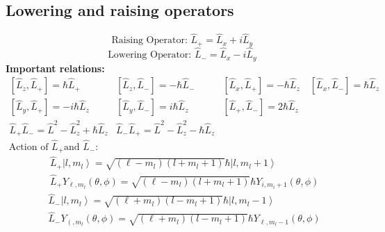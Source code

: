 \subsection{Lowering and raising operators}
	$$\text { Raising Operator: }  \hat{L}_{+}=\hat{L}_{x}+i \hat{L}_{y}$$
	$$\text { Lowering Operator: }  \hat{L}_{-}=\hat{L}_{x}-i \hat{L}_{y}$$
\textbf{Important relations:}
$$
\begin{array}{lll}
{\left[\hat{L}_{z}, \hat{L}_{+}\right]=\hbar \hat{L}_{+}} & {\left[\hat{L}_{z}, \hat{L}_{-}\right]=-\hbar \hat{L}_{-}} & {\left[\hat{L}_{x}, \hat{L}_{+}\right]=-\hbar \hat{L}_{z} \quad\left[\hat{L}_{x}, \hat{L}_{-}\right]=\hbar \hat{L}_{z}} \\
{\left[\hat{L}_{y}, \hat{L}_{+}\right]=-i \hbar \hat{L}_{z}} & {\left[\hat{L}_{y}, \hat{L}_{-}\right]=i \hbar \hat{L}_{z}} & {\left[\hat{L}_{+}, \hat{L}_{-}\right]=2 \hbar \hat{L}_{z}} \\
\hat{L}_{+} \hat{L}_{-}=\hat{L}^{2}-\hat{L}_{z}^{2}+\hbar \hat{L}_{z} & \hat{L}_{-} \hat{L}_{+}=\hat{L}^{2}-\hat{L}_{z}^{2}-\hbar \hat{L}_{z}
\end{array}
$$
$\text { Action of } \hat{L}_{+} \text {and } \hat{L}_{-}:$
$$\begin{aligned}
	&\hat{L}_{+}\left|l, m_{l}\right\rangle=\sqrt{\left(\ell-m_{l}\right)\left(l+m_{l}+1\right)} \hbar\left|l, m_{l}+1\right\rangle \\
	&\hat{L}_{+} Y_{\ell, m_{l}}(\theta, \phi)=\sqrt{\left(\ell-m_{l}\right)\left(l+m_{l}+1\right)} \hbar Y_{i, m_{i}+1}(\theta, \phi)
\end{aligned}$$
$$\begin{aligned}
	&\hat{L}_{-}\left|l, m_{l}\right\rangle=\sqrt{\left(\ell+m_{l}\right)\left(l-m_{l}+1\right)} \hbar\left|l, m_{l}-1\right\rangle \\
	&\hat{L}_{-} Y_{\left(, m_{l}\right.}(\theta, \phi)=\sqrt{\left(\ell+m_{l}\right)\left(l-m_{l}+1\right)} \hbar Y_{\ell, m_{l}-1}(\theta, \phi)
\end{aligned}$$
